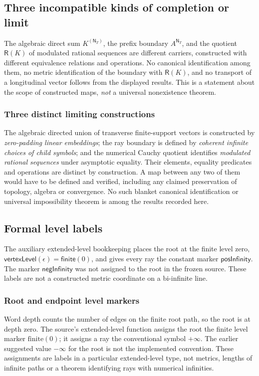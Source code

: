 \documentclass[11pt,reqno]{amsart}
\theoremstyle{definition}\newtheorem{definition}[theorem]{Definition}
\theoremstyle{remark}\newtheorem{remark}[theorem]{Remark}
\newcommand{\N}{\mathsf N_T}\newcommand{\Z}{\mathsf Z_T}\newcommand{\Q}{\mathsf Q_T}\newcommand{\RR}{\mathsf R}
\begin{document}
\subsection{Three incompatible kinds of completion or limit}\label{main:sub-58}
The algebraic direct sum $K^{(\N)}$, the prefix boundary $A^{\N}$, and the quotient $\RR(K)$ of modulated rational sequences are different carriers, constructed with different equivalence relations and operations. No canonical identification among them, no metric identification of the boundary with $\RR(K)$, and no transport of a longitudinal vector follows from the displayed results. This is a statement about the scope of constructed maps, \emph{not} a universal nonexistence theorem.

\medskip
\subsubsection*{Three distinct limiting constructions}\label{supp:15-3}
The algebraic directed union of transverse finite-support vectors is constructed by \emph{zero-padding linear embeddings}; the ray boundary is defined by \emph{coherent infinite choices of child symbols}; and the numerical Cauchy quotient identifies \emph{modulated rational sequences} under asymptotic equality. Their elements, equality predicates and operations are distinct by construction. A map between any two of them would have to be defined and verified, including any claimed preservation of topology, algebra or convergence. No such blanket canonical identification or universal impossibility theorem is among the results recorded here.
\medskip

\subsection{Formal level labels}\label{main:sub-59}
The auxiliary extended-level bookkeeping places the root at the finite level zero, $\mathsf{vertexLevel}(\epsilon)=\mathsf{finite}(0)$, and gives every ray the constant marker $\mathsf{posInfinity}$. The marker $\mathsf{negInfinity}$ was not assigned to the root in the frozen source. These labels are not a constructed metric coordinate on a bi-infinite line.


\medskip
\subsubsection*{Root and endpoint level markers}\label{supp:15-4}
Word depth counts the number of edges on the finite root path, so the root is at depth zero. The source's extended-level function assigns the root the finite level marker $\mathrm{finite}(0)$; it assigns a ray the conventional symbol $+\infty$. The earlier suggested value $-\infty$ for the root is not the implemented convention. These assignments are labels in a particular extended-level type, not metrics, lengths of infinite paths or a theorem identifying rays with numerical infinities.
\medskip
\end{document}

